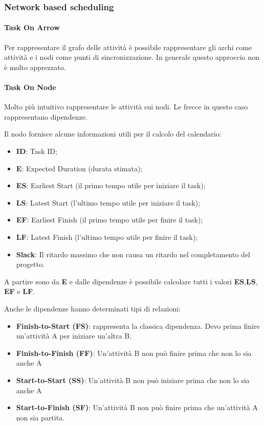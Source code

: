 \subsubsection{Network based scheduling}
\paragraph{Task On Arrow}
Per rappresentare il grafo delle attività è possibile rappresentare gli archi come attività e i nodi come punti di sincronizzazione. In generale questo approccio non è molto apprezzato.
\paragraph{Task On Node}
Molto più intuitivo rappresentare le attività sui nodi. Le frecce in questo caso rappresentano dipendenze.

Il nodo fornisce alcune informazioni utili per il calcolo del calendario:
\begin{itemize}
	\item \textbf{ID}: Task ID;
	\item \textbf{E}: Expected Duration (durata stimata);
	\item \textbf{ES}: Earliest Start (il primo tempo utile per iniziare il task);
	\item \textbf{LS}: Latest Start (l'ultimo tempo utile per iniziare il task);
	\item \textbf{EF}: Earliest Finish (il primo tempo utile per finire il task);
	\item \textbf{LF}: Latest Finish (l'ultimo tempo utile per finire il task);
	\item \textbf{Slack}: Il ritardo massimo che non causa un ritardo nel completamento del progetto.
\end{itemize}
A partire sono da \textbf{E} e dalle dipendenze è possibile calcolare tutti i valori \textbf{ES},\textbf{LS}, \textbf{EF} e \textbf{LF}.

Anche le dipendenze hanno determinati tipi di relazioni:
\begin{itemize}
	\item \textbf{Finish-to-Start (FS)}: rappresenta la classica dipendenza. Devo prima finire un'attività A per iniziare un'altra B.
	\item \textbf{Finish-to-Finish (FF)}: Un'attività B non può finire prima che non lo sia anche A
	\item \textbf{Start-to-Start (SS)}: Un'attività B non può iniziare prima che non lo sia anche A
	\item \textbf{Start-to-Finish (SF)}: Un'attività B non può finire prima che un'attività A non sia partita.
\end{itemize}

